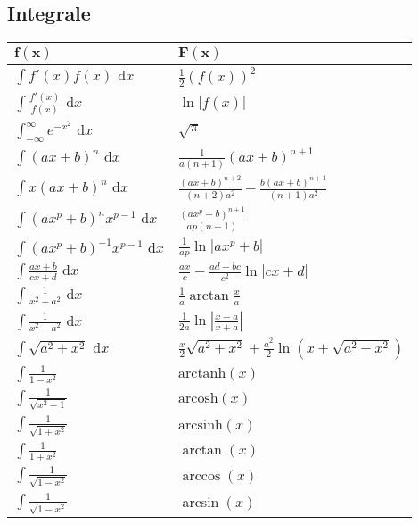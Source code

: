 \documentclass[a4paper,10pt]{article}
\def\dx{\text{ d}x}
\begin{document}
\subsection{Integrale}
\begin{center}
 \begin{tabularx}{\linewidth}{>{\centering\arraybackslash}X>{\centering\arraybackslash}X}
  \toprule
  $\mathbf{f(x)}$ & $\mathbf{F(x)}$ \\
  \midrule
  $\int f'(x) f(x) \dx$ & $\frac{1}{2}(f(x))^2$ \\
  $\int \frac{f'(x)}{f(x)} \dx$ & $\ln|f(x)|$ \\
  $\int_{-\infty}^\infty e^{-x^2} \dx$ & $\sqrt{\pi}$ \\
  $\int (ax+b)^n \dx$ & $\frac{1}{a(n+1)}(ax+b)^{n+1}$ \\
  $\int x(ax+b)^n \dx$ & $\frac{(ax+b)^{n+2}}{(n+2)a^2} - \frac{b(ax+b)^{n+1}}{(n+1)a^2}$ \\
  $\int (ax^p+b)^n x^{p-1} \dx$ & $\frac{(ax^p+b)^{n+1}}{ap(n+1)}$ \\
  $\int (ax^p + b)^{-1} x^{p-1} \dx$ & $\frac{1}{ap} \ln |ax^p + b|$ \\
  $\int \frac{ax+b}{cx+d} \dx$ & $\frac{ax}{c} - \frac{ad-bc}{c^2} \ln |cx +d|$ \\
  $\int \frac{1}{x^2+a^2} \dx$ & $\frac{1}{a} \arctan \frac{x}{a}$ \\
  $\int \frac{1}{x^2 - a^2} \dx$ & $\frac{1}{2a} \ln\left| \frac{x-a}{x+a} \right|$ \\
  $\int \sqrt{a^2+x^2} \dx $ & $\frac{x}{2}\sqrt{a^2 + x^2} + \frac{a^2}{2}\ln(x+\sqrt{a^2+x^2})$ \\
  $\int \frac{1}{1-x^2}$ & $\text{arctanh}(x)$\\
  $\int \frac{1}{\sqrt{x^2-1}}$ & $\text{arcosh}(x)$\\
  $\int \frac{1}{\sqrt{1+x^2}}$ & $\text{arcsinh}(x)$\\
  $\int \frac{1}{1+x^2}$ & $\arctan(x)$\\
  $\int \frac{-1}{\sqrt{1-x^2}}$ & $\arccos(x)$\\
  $\int \frac{1}{\sqrt{1-x^2}}$ & $\arcsin(x)$\\
  \bottomrule
 \end{tabularx}


\end{center}
\end{document}
